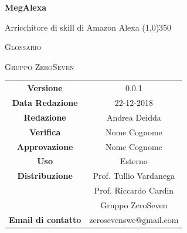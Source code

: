 \documentclass[a4paper,12pt]{article}
\author{Mirko Franco}
\date{14-12-2018}
\begin{document}
\begin{titlepage}
	\centering
	{\huge\bfseries MegAlexa\par}
	Arricchitore di skill di Amazon Alexa
	\line(1,0){350} \\
	{\scshape\LARGE Glossario \par}
	\vspace{1cm}
	{\scshape Gruppo ZeroSeven \par}
	\logo
		\begin{tabular}{c|c}
		{\hfill \textbf{Versione}} 			& 0.0.1				\\
		{\hfill\textbf{Data Redazione}} 	& 22-12-2018		\\ 
		{\hfill\textbf{Redazione}} 			& Andrea Deidda			\\ 
		{\hfill\textbf{Verifica}} 				&  	Nome Cognome				\\ 
		{\hfill\textbf{Approvazione}} 		&  		Nome Cognome			\\ 
		{\hfill\textbf{Uso}} 					& 		Esterno		\\ 
		{\hfill\textbf{Distribuzione}} 			& 			Prof. Tullio Vardanega \\ & Prof. Riccardo Cardin \\ & Gruppo ZeroSeven		\\ 
		{\hfill\textbf{Email di contatto}} & zerosevenswe@gmail.com \\
	\end{tabular}
\end{titlepage}

	\label{LastFrontPage}
	\newpage	
	
	\pagestyle{mymain}
	\tableofcontents
		
	
	
	
%	
	
	
%	
	
	
	
%	
	
	
%	
	
%	
	
	
	
	
	
	
	
	\printindex
	\label{LastPage}
	
	
\end{document}
